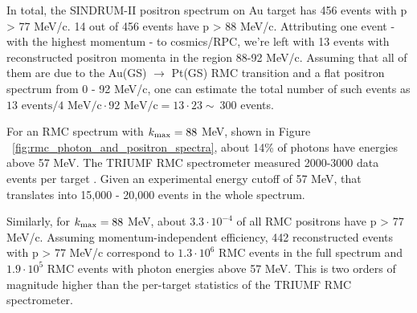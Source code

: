 \documentclass[12pt]{article}
\newcommand {\ra}        {\rightarrow}
\newcommand {\kmax}      {\mbox{$k_{\rm max}$}}
\begin{document}
In total, the SINDRUM-II positron spectrum on Au target has 456 events with p > 77 MeV/c.
14 out of 456 events have p > 88 MeV/c. Attributing one event - with the highest
momentum - to cosmics/RPC, we're left with 13 events with reconstructed positron
momenta in the region 88-92 MeV/c. Assuming that all of them are due to the
Au(GS) $\ra$ Pt(GS) RMC transition and a flat positron spectrum from 0 - 92 MeV/c,
one can estimate the total number of such events as $13\text{ events}/4\text{ MeV/c}\cdot 92\text{ MeV/c} = 13\cdot 23 \sim\ 300$ events.

For an RMC spectrum with $\kmax = 88$ MeV, shown in Figure ~\ref{fig:rmc_photon_and_positron_spectra}, 
about 14\% of photons have energies above 57 MeV.
The TRIUMF RMC spectrometer measured 2000-3000 data events per target \cite{RMC_1999_PhysRevC.59.2853}.
Given an experimental energy cutoff of 57 MeV, that translates into 15,000 - 20,000
events in the whole spectrum. 

Similarly, for $\kmax= 88$ MeV, about $3.3\cdot 10^{-4}$ of all RMC positrons have
p > 77 MeV/c. Assuming momentum-independent efficiency, 442 reconstructed events
with p > 77 MeV/c correspond to $1.3\cdot 10^6$ RMC events in the full spectrum
and $1.9\cdot 10^5$ RMC events with photon energies above 57 MeV. This is two orders
of magnitude higher than the per-target statistics of the TRIUMF RMC spectrometer.
\end{document}
